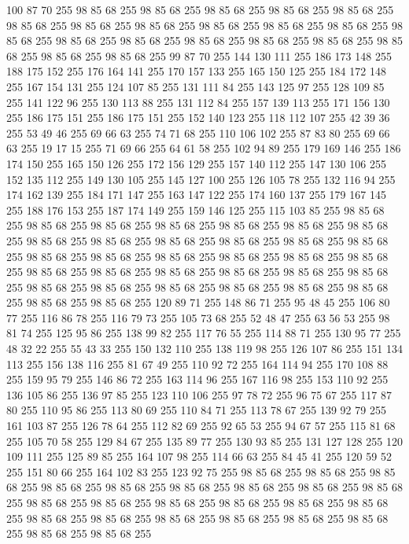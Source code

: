 100 87 70 255 98 85 68 255 98 85 68 255 98 85 68 255 98 85 68 255 98 85 68 255 98 85 68 255 98 85 68 255 98 85 68 255 98 85 68 255 98 85 68 255 98 85 68 255 98 85 68 255 98 85 68 255 98 85 68 255 98 85 68 255 98 85 68 255 98 85 68 255 98 85 68 255 98 85 68 255 98 85 68 255 99 87 70 255 144 130 111 255 186 173 148 255 188 175 152 255 176 164 141 255 170 157 133 255 165 150 125 255 184 172 148 255 167 154 131 255 124 107 85 255 131 111 84 255 143 125 97 255 128 109 85 255 141 122 96 255 130 113 88 255 131 112 84 255 157 139 113 255 171 156 130 255 186 175 151 255 186 175 151 255 152 140 123 255 118 112 107 255 42 39 36 255 53 49 46 255 69 66 63 255 74 71 68 255 110 106 102 255 87 83 80 255 69 66 63 255 19 17 15 255 71 69 66 255 64 61 58 255 102 94 89 255 179 169 146 255 186 174 150 255 165 150 126 255 172 156 129 255 157 140 112 255 147 130 106 255 152 135 112 255 149 130 105 255 145 127 100 255 126 105 78 255
132 116 94 255 174 162 139 255 184 171 147 255 163 147 122 255 174 160 137 255 179 167 145 255 188 176 153 255 187 174 149 255 159 146 125 255 115 103 85 255 98 85 68 255 98 85 68 255 98 85 68 255 98 85 68 255 98 85 68 255 98 85 68 255 98 85 68 255 98 85 68 255 98 85 68 255 98 85 68 255 98 85 68 255 98 85 68 255 98 85 68 255 98 85 68 255 98 85 68 255 98 85 68 255 98 85 68 255 98 85 68 255 98 85 68 255 98 85 68 255 98 85 68 255 98 85 68 255 98 85 68 255 98 85 68 255 98 85 68 255 98 85 68 255 98 85 68 255 98 85 68 255 98 85 68 255 98 85 68 255 98 85 68 255 98 85 68 255 98 85 68 255 120 89 71 255 148 86 71 255 95 48 45 255 106 80 77 255 116 86 78 255 116 79 73 255 105 73 68 255 52 48 47 255 63 56 53 255 98 81 74 255 125 95 86 255 138 99 82 255 117 76 55 255 114 88 71 255 130 95 77 255 48 32 22 255 55 43 33 255 150 132 110 255 138 119 98 255 126 107 86 255 151 134 113 255
156 138 116 255 81 67 49 255 110 92 72 255 164 114 94 255 170 108 88 255 159 95 79 255 146 86 72 255 163 114 96 255 167 116 98 255 153 110 92 255 136 105 86 255 136 97 85 255 123 110 106 255 97 78 72 255 96 75 67 255 117 87 80 255 110 95 86 255 113 80 69 255 110 84 71 255 113 78 67 255 139 92 79 255 161 103 87 255 126 78 64 255 112 82 69 255 92 65 53 255 94 67 57 255 115 81 68 255 105 70 58 255 129 84 67 255 135 89 77 255 130 93 85 255 131 127 128 255 120 109 111 255 125 89 85 255 164 107 98 255 114 66 63 255 84 45 41 255 120 59 52 255 151 80 66 255 164 102 83 255 123 92 75 255 98 85 68 255 98 85 68 255 98 85 68 255 98 85 68 255 98 85 68 255 98 85 68 255 98 85 68 255 98 85 68 255 98 85 68 255 98 85 68 255 98 85 68 255 98 85 68 255 98 85 68 255 98 85 68 255 98 85 68 255 98 85 68 255 98 85 68 255 98 85 68 255 98 85 68 255 98 85 68 255 98 85 68 255 98 85 68 255 98 85 68 255
